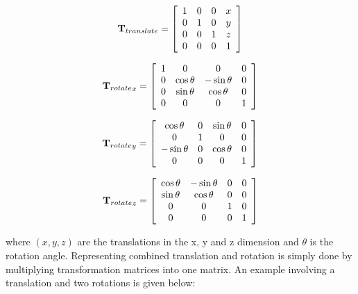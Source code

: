 	\begin{equation}
		\textbf{T}_{translate} =
		\left[ {\begin{array}{cccc}
		1 & 0 & 0 & x \\
		0 & 1 & 0 & y \\
		0 & 0 & 1 & z \\
		0 & 0 & 0 & 1 \\
		\end{array} } \right]
		\label{eq:transformation_matrices_0}
	\end{equation}
	
	\begin{equation}
		{\textbf{T}_{rotate}}_x =
		\left[ {\begin{array}{cccc}
		1 & 0 & 0 & 0 \\
		0 & \cos{\theta} & -\sin{\theta} & 0 \\
		0 & \sin{\theta} & \cos{\theta} & 0 \\
		0 & 0 & 0 & 1 \\
		\end{array} } \right]
		\label{eq:transformation_matrices_1}
	\end{equation}
	
	\begin{equation}
		{\textbf{T}_{rotate}}_y =
		\left[ {\begin{array}{cccc}
		\cos{\theta} & 0 & \sin{\theta} & 0 \\
		0 & 1 & 0 & 0 \\
		-\sin{\theta} & 0 & \cos{\theta} & 0 \\
		0 & 0 & 0 & 1 \\
		\end{array} } \right]
		\label{eq:transformation_matrices_2}
	\end{equation}
	
	\begin{equation}
		{\textbf{T}_{rotate}}_z =
		\left[ {\begin{array}{cccc}
		\cos{\theta} & -\sin{\theta} & 0 & 0 \\
		\sin{\theta} & \cos{\theta} & 0 & 0 \\
		0 & 0 & 1 & 0 \\
		0 & 0 & 0 & 1 \\
		\end{array} } \right]
		\label{eq:transformation_matrices_3}
	\end{equation}
	
	where $(x, y, z)$ are the translations in the x, y and z dimension and $\theta$ is the rotation angle. Representing combined translation and rotation is simply done by multiplying transformation matrices into one matrix. An example involving a translation and two rotations is given below:
	

